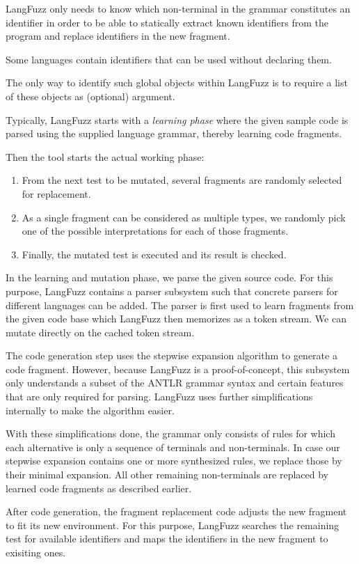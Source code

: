LangFuzz only needs to know which non-terminal in the grammar constitutes an identifier in order to be able to statically extract known identifiers from the program and replace identifiers in the new fragment.

Some languages contain identifiers that can be used without declaring them.

The only way to identify such global objects within LangFuzz is to require a list of these objects as (optional) argument.

Typically, LangFuzz starts with a \textit{learning phase} where the given sample code is parsed using the supplied language grammar, thereby learning code fragments.

Then the tool starts the actual working phase:
\begin{enumerate}
    \item From the next test to be mutated, several fragments are randomly selected for replacement.
    \item As a single fragment can be considered as multiple types, we randomly pick one of the possible interpretations for each of those fragments.
    \item Finally, the mutated test is executed and its result is checked.
\end{enumerate}

In the learning and mutation phase, we parse the given source code. For this purpose, LangFuzz contains a parser subsystem such that concrete parsers for different languages can be added.
The parser is first used to learn fragments from the given code base which LangFuzz then memorizes as a token stream.
We can mutate directly on the cached token stream.

The code generation step uses the stepwise expansion algorithm to generate a code fragment.
However, because LangFuzz is a proof-of-concept, this subsystem only understands a subset of the ANTLR grammar syntax and certain features that are only required for parsing.
LangFuzz uses further simplifications internally to make the algorithm easier.

With these simplifications done, the grammar only consists of rules for which each alternative is only a sequence of terminals and non-terminals.
In case our stepwise expansion contains one or more synthesized rules, we replace those by their minimal expansion.
All other remaining non-terminals are replaced by learned code fragments as described earlier.

After code generation, the fragment replacement code adjusts the new fragment to fit its new environment.
For this purpose, LangFuzz searches the remaining test for available identifiers and maps the identifiers in the new fragment to exisiting ones.

